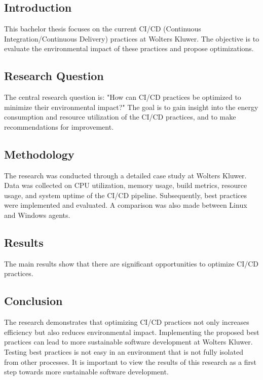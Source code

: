 
\chapter*{}

\section{Introduction}
This bachelor thesis focuses on the current CI/CD (Continuous Integration/Continuous Delivery) practices at Wolters Kluwer. The objective is to evaluate the environmental impact of these practices and propose optimizations.

\section{Research Question}
The central research question is: "How can CI/CD practices be optimized to minimize their environmental impact?" The goal is to gain insight into the energy consumption and resource utilization of the CI/CD practices, and to make recommendations for improvement.

\section{Methodology}
The research was conducted through a detailed case study at Wolters Kluwer. Data was collected on CPU utilization, memory usage, build metrics, resource usage, and system uptime of the CI/CD pipeline. Subsequently, best practices were implemented and evaluated. A comparison was also made between Linux and Windows agents.

\section{Results}
The main results show that there are significant opportunities to optimize CI/CD practices.

\section{Conclusion}
The research demonstrates that optimizing CI/CD practices not only increases efficiency but also reduces environmental impact. Implementing the proposed best practices can lead to more sustainable software development at Wolters Kluwer. Testing best practices is not easy in an environment that is not fully isolated from other processes. It is important to view the results of this research as a first step towards more sustainable software development.







